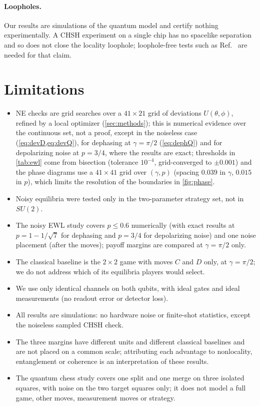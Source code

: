 \documentclass[11pt,a4paper]{article}
\begin{document}
\paragraph{Loopholes.} Our results are simulations of the quantum model and certify nothing experimentally. A CHSH experiment on a single chip has no spacelike separation and so does not close the locality loophole; loophole-free tests such as Ref.~\cite{hensen} are needed for that claim.

\section{Limitations}

\begin{itemize}
\item NE checks are grid searches over a $41\times21$ grid of deviations $U(\theta,\phi)$, refined by a local optimizer (\cref{sec:methods}); this is numerical evidence over the continuous set, not a proof, except in the noiseless case (\cref{eq:devD,eq:devQ}), for dephasing at $\gamma=\pi/2$ (\cref{eq:dephQ}) and for depolarizing noise at $p=3/4$, where the results are exact; thresholds in \cref{tab:ewl} come from bisection (tolerance $10^{-4}$, grid-converged to $\pm0.001$) and the phase diagrams use a $41\times41$ grid over $(\gamma,p)$ (spacing $0.039$ in $\gamma$, $0.015$ in $p$), which limits the resolution of the boundaries in \cref{fig:phase}.
\item Noisy equilibria were tested only in the two-parameter strategy set, not in $SU(2)$.
\item The noisy EWL study covers $p\le0.6$ numerically (with exact results at $p=1-1/\sqrt7$ for dephasing and $p=3/4$ for depolarizing noise) and one noise placement (after the moves); payoff margins are compared at $\gamma=\pi/2$ only.
\item The classical baseline is the $2\times2$ game with moves $C$ and $D$ only, at $\gamma=\pi/2$; we do not address which of its equilibria players would select.
\item We use only identical channels on both qubits, with ideal gates and ideal measurements (no readout error or detector loss).
\item All results are simulations: no hardware noise or finite-shot statistics, except the noiseless sampled CHSH check.
\item The three margins have different units and different classical baselines and are not placed on a common scale; attributing each advantage to nonlocality, entanglement or coherence is an interpretation of these results.
\item The quantum chess study covers one split and one merge on three isolated squares, with noise on the two target squares only; it does not model a full game, other moves, measurement moves or strategy.
\end{itemize}
\end{document}

